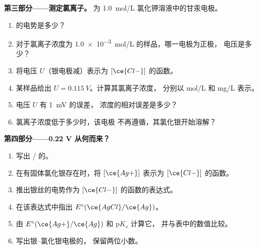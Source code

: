 \begin{problem}
\medskip
\noindent\textbf{第三部分——测定氯离子。}
为 \qty{1.0}{mol/L}
氯化钾溶液中的甘汞电极。
\begin{enumerate}[resume]
  \item {}的电势是多少？
  \item 对于氯离子浓度为 \qty{1.0e-3}{mol/L} 的样品，哪一电极为正极，
        电压是多少？
  \item 将电压 $U$（银电极减）表示为
        $[\ce{Cl-}]$ 的函数。
  \item 某样品给出 $U = \qty{0.115}{V}$。计算其氯离子浓度，
        分别以 \unit{mol/L} 和 \unit{mg/L} 表示。
  \item 电压 $U$ 有 \qty{1}{mV} 的误差，
        浓度的相对误差是多少？
  \item 氯离子浓度低于多少时，该电极
        不再遵循，其氯化银开始溶解？
\end{enumerate}

\medskip
\noindent\textbf{第四部分——0.22 V 从何而来？}
\begin{enumerate}[resume]
  \item 写出 / 的。
  \item 在有固体氯化银存在时，将 $[\ce{Ag+}]$ 表示为
        $[\ce{Cl-}]$ 的函数。
  \item 推出银丝的电势作为
        $[\ce{Cl-}]$ 的函数的表达式。
  \item 在该表达式中指出 $E^\circ(\ce{AgCl}/\ce{Ag})$。
  \item 由 $E^\circ(\ce{Ag+}/\ce{Ag})$ 和 $\mathrm{p}K_s$ 计算它，
        并与表中的数值比较。
  \item 写出银–氯化银电极的，
        保留两位小数。
\end{enumerate}
\end{problem}
